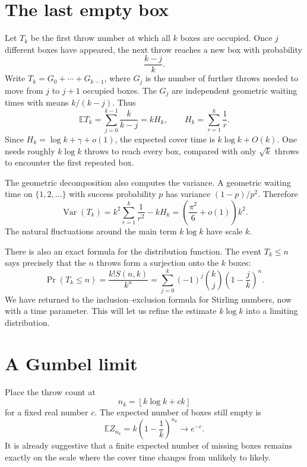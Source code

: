 \section{The last empty box}

Let \(T_k\) be the first throw number at which all \(k\) boxes are occupied. Once \(j\) different boxes have appeared, the next throw reaches a new box with probability
\[
 \frac{k-j}{k}.
\]
Write \(T_k=G_0+\cdots+G_{k-1}\), where \(G_j\) is the number of further throws needed to move from \(j\) to \(j+1\) occupied boxes. The \(G_j\) are independent geometric waiting times with means \(k/(k-j)\). Thus
\[
 \boxed{\mathbb E T_k
 =\sum_{j=0}^{k-1}\frac{k}{k-j}
 =kH_k,\qquad H_k=\sum_{r=1}^k\frac1r.}
\]
Since \(H_k=\log k+\gamma+o(1)\), the expected cover time is \(k\log k+O(k)\). One needs roughly \(k\log k\) throws to reach every box, compared with only \(\sqrt{k}\) throws to encounter the first repeated box.

The geometric decomposition also computes the variance. A geometric waiting time on \(\{1,2,\ldots\}\) with success probability \(p\) has variance \((1-p)/p^2\). Therefore
\[
 \boxed{\operatorname{Var}(T_k)
 =k^2\sum_{r=1}^k\frac1{r^2}-kH_k
 =\left(\frac{\pi^2}{6}+o(1)\right)k^2.}
\]
The natural fluctuations around the main term \(k\log k\) have scale \(k\).

There is also an exact formula for the distribution function. The event \(T_k\le n\) says precisely that the \(n\) throws form a surjection onto the \(k\) boxes:
\[
 \boxed{\Pr(T_k\le n)
 =\frac{k!S(n,k)}{k^n}
 =\sum_{j=0}^k(-1)^j\binom kj
        \left(1-\frac jk\right)^n.}
\]
We have returned to the inclusion--exclusion formula for Stirling numbers, now with a time parameter. This will let us refine the estimate \(k\log k\) into a limiting distribution.

\section{A Gumbel limit}

Place the throw count at
\[
 n_k=\left\lfloor k\log k+ck\right\rfloor
\]
for a fixed real number \(c\). The expected number of boxes still empty is
\[
 \mathbb E Z_{n_k}
 =k\left(1-\frac1k\right)^{n_k}
 \longrightarrow e^{-c}.
\]
It is already suggestive that a finite expected number of missing boxes remains exactly on the scale where the cover time changes from unlikely to likely.

